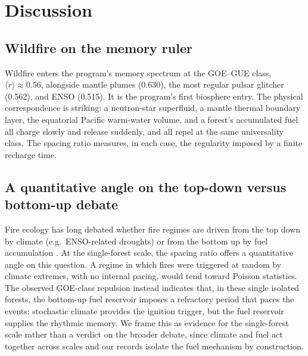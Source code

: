 \documentclass[12pt,a4paper]{article}
\begin{document}
\section{Discussion}
\subsection{Wildfire on the memory ruler}
Wildfire enters the program's memory spectrum at the GOE--GUE class, $\langle r\rangle\approx0.56$, alongside mantle plumes (0.630), the most regular pulsar glitcher (0.562), and ENSO (0.515). It is the program's first biosphere entry. The physical correspondence is striking: a neutron-star superfluid, a mantle thermal boundary layer, the equatorial Pacific warm-water volume, and a forest's accumulated fuel all charge slowly and release suddenly, and all repel at the same universality class. The spacing ratio measures, in each case, the regularity imposed by a finite recharge time.

\subsection{A quantitative angle on the top-down versus bottom-up debate}
Fire ecology has long debated whether fire regimes are driven from the top down by climate (e.g.\ ENSO-related droughts) or from the bottom up by fuel accumulation \citep{falk2011}. At the single-forest scale, the spacing ratio offers a quantitative angle on this question. A regime in which fires were triggered at random by climate extremes, with no internal pacing, would tend toward Poisson statistics. The observed GOE-class repulsion instead indicates that, in these single isolated forests, the bottom-up fuel reservoir imposes a refractory period that paces the events: stochastic climate provides the ignition trigger, but the fuel reservoir supplies the rhythmic memory. We frame this as evidence for the single-forest scale rather than a verdict on the broader debate, since climate and fuel act together across scales and our records isolate the fuel mechanism by construction.
\end{document}
